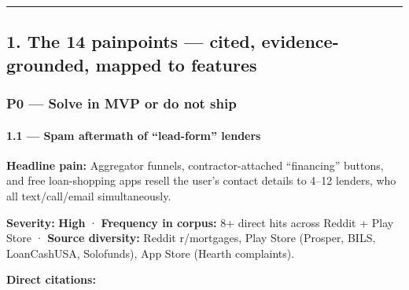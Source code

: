 \documentclass[
  10pt,
]{article}
\begin{document}
\begin{center}\rule{0.5\linewidth}{0.5pt}\end{center}

\hypertarget{the-14-painpoints-cited-evidence-grounded-mapped-to-features}{%
\subsection{1. The 14 painpoints --- cited, evidence-grounded, mapped to
features}\label{the-14-painpoints-cited-evidence-grounded-mapped-to-features}}

\hypertarget{p0-solve-in-mvp-or-do-not-ship}{%
\subsubsection{P0 --- Solve in MVP or do not ship}\label{p0-solve-in-mvp-or-do-not-ship}}

\hypertarget{spam-aftermath-of-lead-form-lenders}{%
\paragraph{1.1 --- Spam aftermath of ``lead-form''
lenders}\label{spam-aftermath-of-lead-form-lenders}}

\textbf{Headline pain:} Aggregator funnels, contractor-attached ``financing'' buttons, and free
loan-shopping apps resell the user's contact details to 4--12 lenders, who all text/call/email
simultaneously.

\textbf{Severity:} \textbf{High} · \textbf{Frequency in corpus:} 8+ direct hits across Reddit + Play
Store · \textbf{Source diversity:} Reddit r/mortgages, Play Store (Prosper, BILS, LoanCashUSA,
Solofunds), App Store (Hearth complaints).

\textbf{Direct citations:}
\end{document}
